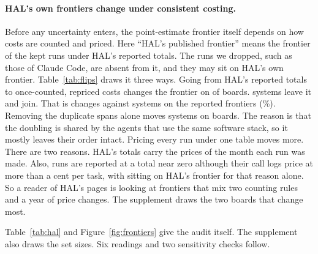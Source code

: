 \documentclass[11pt]{article}
\begin{document}
\paragraph{HAL's own frontiers change under consistent costing.}
\begin{table}[!tbp]
\centering\small
\resizebox{\textwidth}{!}{}
\caption{The plain frontier of each board under three costings of the same kept runs. The first is HAL's reported totals. The second is those totals with the duplicate spans removed (HAL's historical prices kept). The third is the once-counted, repriced costs of the audit. Lost and gained: systems that leave or join the frontier going from HAL's costing to ours. The last two columns split the changes into those made by counting each call once and those made by repricing after that. A frontier that changes under a costing rule is a finding about the rule. It is not advice on what to buy.}
\label{tab:flips}
\end{table}
Before any uncertainty enters, the point-estimate frontier itself depends on how costs are counted and priced. Here ``HAL's published frontier'' means the frontier of the kept runs under HAL's reported totals. The runs we dropped, such as those of Claude Code, are absent from it, and they may sit on HAL's own frontier. Table~\ref{tab:flips} draws it three ways. Going from HAL's reported totals to once-counted, repriced costs changes the frontier on \NumFlipBoardsChanged{} of \NumFlipBoards{} boards. \NumFlipLost{} systems leave it and \NumFlipGained{} join. That is \NumFlipSystemsChanged{} changes against \NumFlipFrontierReported{} systems on the reported frontiers (\NumFlipChangedPct\%). Removing the duplicate spans alone moves \NumFlipCounting{} systems on \NumFlipBoardsChangedCounting{} boards. The reason is that the doubling is shared by the agents that use the same software stack, so it mostly leaves their order intact. Pricing every run under one table moves \NumFlipPricing{} more. There are two reasons. HAL's totals carry the prices of the month each run was made. Also, \NumFlipZeroReported{} runs are reported at a total near zero although their call logs price at more than a cent per task, with \NumFlipZeroPhrase{} sitting on HAL's frontier for that reason alone. So a reader of HAL's pages is looking at frontiers that mix two counting rules and a year of price changes. The supplement draws the two boards that change most.


Table~\ref{tab:hal} and Figure~\ref{fig:frontiers} give the audit itself. The supplement also draws the set sizes. Six readings and two sensitivity checks follow.
\end{document}
